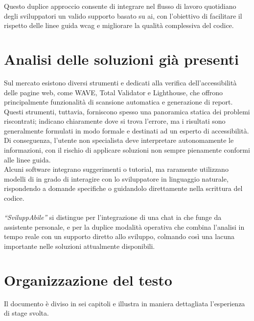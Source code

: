 Questo duplice approccio consente di integrare nel flusso di lavoro quotidiano degli sviluppatori un valido supporto basato su \acrshort{ai}, con l’obiettivo di facilitare il rispetto delle linee guida \acrshort{wcag} e migliorare la qualità complessiva del codice.

\section{Analisi delle soluzioni già presenti}
\noindent Sul mercato esistono diversi strumenti e  dedicati alla verifica dell’accessibilità delle pagine web, come WAVE, Total Validator e Lighthouse, che offrono principalmente funzionalità di scansione automatica e generazione di report.\\ 
Questi strumenti, tuttavia, forniscono spesso una panoramica statica dei problemi riscontrati; indicano chiaramente dove si trova l’errore, ma i risultati sono generalmente formulati in modo formale e destinati ad un esperto di accessibilità. Di conseguenza, l’utente non specialista deve interpretare autonomamente le informazioni, con il rischio di applicare soluzioni non sempre pienamente conformi alle linee guida.\\ 
Alcuni software integrano suggerimenti o tutorial, ma raramente utilizzano modelli di  in grado di interagire con lo sviluppatore in linguaggio naturale, rispondendo a domande specifiche o guidandolo direttamente nella scrittura del codice. \\
\\
\textit{“SviluppAbile”} si distingue per l’integrazione di una chat \acrshort{ia} che funge da assistente personale, e per la duplice modalità operativa che combina l’analisi in tempo reale con un supporto diretto allo sviluppo, colmando così una lacuna importante nelle soluzioni attualmente disponibili.

\section{Organizzazione del testo}
\noindent Il documento è diviso in sei capitoli e illustra in maniera dettagliata l’esperienza di stage svolta.


